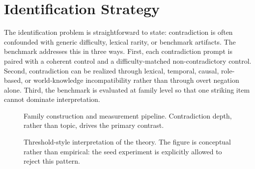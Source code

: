 \documentclass{svjour3}
\begin{document}
\section{Identification Strategy}
The identification problem is straightforward to state: contradiction is often confounded with generic difficulty, lexical rarity, or benchmark artifacts. The benchmark addresses this in three ways. First, each contradiction prompt is paired with a coherent control and a difficulty-matched non-contradictory control. Second, contradiction can be realized through lexical, temporal, causal, role-based, or world-knowledge incompatibility rather than through overt negation alone. Third, the benchmark is evaluated at family level so that one striking item cannot dominate interpretation.

\begin{figure}[t]
\centering
{}
\caption{Family construction and measurement pipeline. Contradiction depth, rather than topic, drives the primary contrast.}
\label{fig:hp-flow}
\end{figure}

\begin{figure}[t]
\centering
{}
\caption{Threshold-style interpretation of the theory. The figure is conceptual rather than empirical: the seed experiment is explicitly allowed to reject this pattern.}
\label{fig:hp-threshold}
\end{figure}
\end{document}
